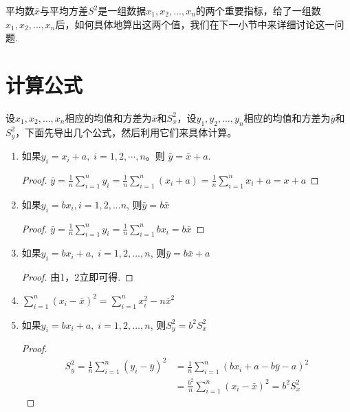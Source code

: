 平均数$\bar x$与平均方差$S^2$是一组数据$x_1,x_2,\ldots,x_{n}$的两个重要指标，给了一组数$x_1,x_2,\ldots,x_{n}$后，如何具体地算出这两个值，我们在下一小节中来详细讨论这一问题.

\section*{计算公式}
设$x_1,x_2,\ldots,x_{n}$相应的均值和方差为$\bar x$和$S^2_x$，设$y_1,y_2,\ldots,y_{n}$相应的均值和方差为$\bar y$和$S^2_y$，下面先导出几个公式，然后利用它们来具体计算。

\begin{enumerate}
    \item 如果$y_i=x_i+a,\; i=1,2,\cdots,n$。则 $\bar {y}= \bar{x} + a$.
    
\begin{proof}
     $\bar{y} = \frac 1n\sum\limits_{i= 1}^{n}y_{i}= \frac 1n\sum\limits _{i= 1}^{n} ({x_{i}+ a}) = \frac 1n\sum\limits _{i= 1}^{n}x_{i}+ a= x+ a$
\end{proof}
    
\item 如果$y_i=bx_i,i=1,2,...n$, 则$\bar{y}=b\bar{x}$

\begin{proof}
$\bar y= {\frac 1n}\sum\limits _{i= 1}^{n}y_{i}= {\frac 1n}\sum\limits _{i= 1}^{n}bx_{i}= b {\bar {x}}$
\end{proof}

    \item 如果$y_i= bx_{i}+ a,\; i= 1, 2, \ldots, n$, 则$\bar {y}=b\bar{x} + a$
  
\begin{proof}
    由1，2立即可得.
\end{proof}  
    \item $\sum\limits _{i= 1}^{n}\left (  x_{i}- \bar {x} \right ) ^{2}= \sum\limits _{i= 1}^{n}x_{i}^{2}- n\bar {x}^{2}$

\item 如果$y_i=bx_i+a,\; i=1,2,\ldots,n$, 则$S_y^{2}=b^{2}S_{x}^{2}$

\begin{proof}
\[\begin{split}
    S_{y}^{2}= {\frac 1n}\sum\limits  _{i= 1}^{n}(y_{i}- \bar{y})^2&=\frac{1}{n}\sum\limits ^n_{i=1}\left ( bx_{i}+ a- b\bar{y} - a\right ) ^{2}\\
    &=\frac{b^{2}}{n}\sum\limits _{i=1}^{n}(x_{i}-\bar{x})^{2}=b^{2}S_{x}^{2}
\end{split}\]
\end{proof}
\end{enumerate}

